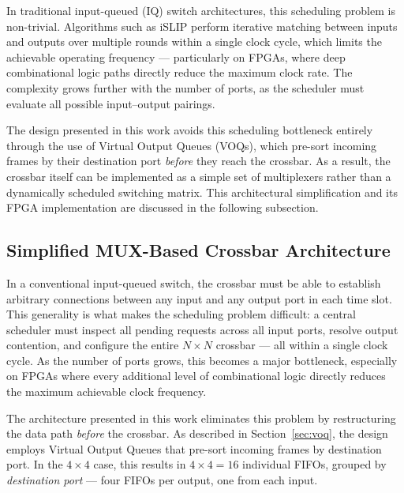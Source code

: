 In traditional input-queued (IQ) switch architectures, this scheduling problem is non-trivial. 
Algorithms such as iSLIP perform iterative matching between inputs and outputs over 
multiple rounds within a single clock cycle, which limits the achievable operating frequency 
--- particularly on FPGAs, where deep combinational logic paths directly reduce the maximum 
clock rate. The complexity grows further with the number of ports, as the scheduler must 
evaluate all possible input--output pairings.

The design presented in this work avoids this scheduling bottleneck entirely through the use 
of Virtual Output Queues (VOQs), which pre-sort incoming frames by their destination port 
\emph{before} they reach the crossbar. As a result, the crossbar itself can be implemented as a 
simple set of multiplexers rather than a dynamically scheduled switching matrix. This 
architectural simplification and its FPGA implementation are discussed in the following 
subsection.





\subsection{Simplified MUX-Based Crossbar Architecture}
\label{subsec:crossbar_simplified}

In a conventional input-queued switch, the crossbar must be able to establish arbitrary 
connections between any input and any output port in each time slot. This generality is what 
makes the scheduling problem difficult: a central scheduler must inspect all pending requests 
across all input ports, resolve output contention, and configure the entire $N \times N$ 
crossbar --- all within a single clock cycle. As the number of ports grows, this becomes a 
major bottleneck, especially on FPGAs where every additional level of combinational logic 
directly reduces the maximum achievable clock frequency.

The architecture presented in this work eliminates this problem by restructuring the data path 
\emph{before} the crossbar. As described in Section~\ref{sec:voq}, the design employs 
Virtual Output Queues that pre-sort incoming frames by destination port. In the $4 \times 4$ 
case, this results in $4 \times 4 = 16$ individual FIFOs, grouped by \emph{destination 
port} --- four FIFOs per output, one from each input.

